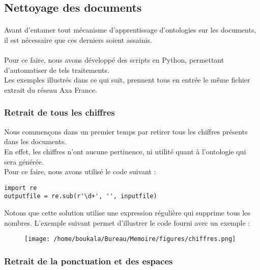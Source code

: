 \documentclass[12pt, a4paper, oneside]{book}
\begin{document}
\subsection{Nettoyage des documents}
\paragraph{}
Avant d'entamer tout mécanisme d'apprentissage d'ontologies sur les documents, il est nécessaire que ces derniers soient assainis.
\paragraph{}
Pour ce faire, nous avons développé des scripts en Python, permettant d'automatiser de tels traitements. \\
Les exemples illustrés dans ce qui suit, prennent tous en entrée le même fichier extrait du réseau Axa France.

\subsubsection{Retrait de tous les chiffres}

Nous commençons dans un premier temps par retirer tous les chiffres présents dans les documents.\\
En effet, les chiffres n'ont aucune pertinence, ni utilité quant à l'ontologie qui sera générée.\\
Pour ce faire, nous avons utilisé le code suivant :

\begin{verbatim}
import re
outputfile = re.sub(r'\d+', '', inputfile)
\end{verbatim}

Notons que cette solution utilise une expression régulière qui supprime tous les nombres.
L'exemple suivant permet d'illustrer le code fourni avec un exemple :


\begin{figure}[h!]
\begin{center}
\texttt{[image: /home/boukala/Bureau/Memoire/figures/chiffres.png]}
\end{center}
\end{figure}






\subsubsection{Retrait de la ponctuation et des espaces}
\end{document}
